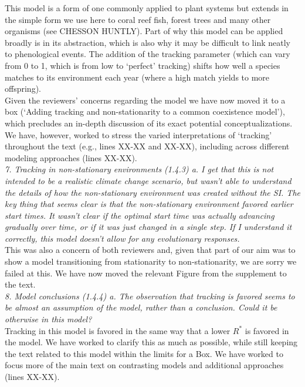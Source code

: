 \documentclass[11pt]{article}
\begin{document}
This model is a form of one commonly applied to plant systems but extends in the simple form we use here to coral reef fish, forest trees and many other organisms (see CHESSON HUNTLY). Part of why this model can be applied broadly is in its abstraction, which is also why it may be difficult to link neatly to phenological events. The addition of the tracking parameter (which can vary from 0 to 1, which is from low to `perfect' tracking) shifts how well a species matches to its environment each year (where a high match yields to more offspring). \\

Given the reviewers' concerns regarding the model we have now moved it to a box (`Adding tracking and non-stationarity to a common coexistence model'), which precludes an in-depth discussion of its exact potential conceptualizations. We have, however, worked to stress the varied interpretations of `tracking' throughout the text (e.g., lines XX-XX and XX-XX), including across different modeling approaches (lines XX-XX).\\

\emph{7.      Tracking in non-stationary environments (1.4.3)
a.      I get that this is not intended to be a realistic climate change scenario, but wasn’t
able to understand the details of how the non-stationary environment was created without the
SI. The key thing that seems clear is that the non-stationary environment favored earlier
start times. It wasn’t clear if the optimal start time was actually advancing gradually over
time, or if it was just changed in a single step. If I understand it correctly, this model
doesn’t allow for any evolutionary responses.}\\

This was also a concern of both reviewers and, given that part of our aim was to show a model transitioning from stationarity to non-stationarity, we are sorry we failed at this. We have now moved the relevant Figure from the supplement to the text. \\

\emph{8.      Model conclusions (1.4.4)
a.      The observation that tracking is favored seems to be almost an assumption of the
model, rather than a conclusion. Could it be otherwise in this model?}\\

Tracking in this model is favored in the same way that a lower $R^*$ is favored in the model. We have worked to clarify this as much as possible, while still keeping the text related to this model within the limits for a Box. We have worked to focus more of the main text on contrasting models and additional approaches (lines XX-XX).\\
\end{document}
